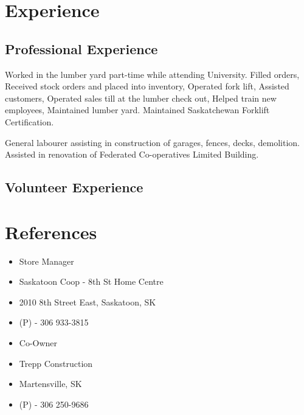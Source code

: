 \documentclass[11pt,letterpaper,sans]{moderncv}        %
\begin{document}
\section{Experience}
\subsection{Professional Experience}
{
  Worked in the lumber yard part-time while attending University.
  \newline{}
  Filled orders, Received stock orders and placed into inventory, Operated fork lift, Assisted customers, Operated sales till at the lumber check out, Helped train new employees, Maintained  lumber yard. Maintained Saskatchewan Forklift Certification.
}

{
  General labourer assisting in construction of garages, fences, decks, demolition. Assisted in renovation of Federated Co-operatives Limited Building.
}

\subsection{Volunteer Experience}



\section{References}
{
  \begin{itemize}
    \item Store Manager
    \item Saskatoon Coop - 8th St Home Centre
    \item 2010 8th Street East, Saskatoon, SK
    \item (P) - 306 933-3815
  \end{itemize}
}

{
  \begin{itemize}
    \item Co-Owner
    \item Trepp Construction
    \item Martensville, SK
    \item (P) - 306 250-9686
  \end{itemize}
}
\end{document}
